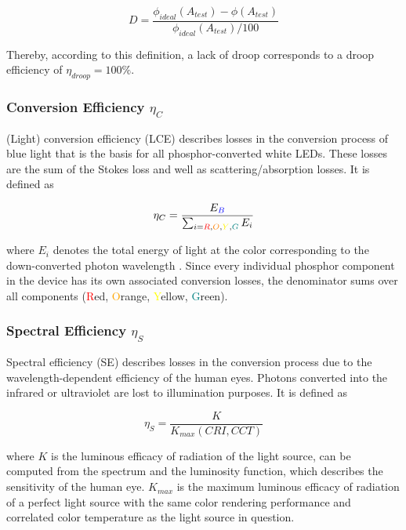 \documentclass[twoside,twocolumn,9pt]{article}
\begin{document}
\begin{equation}
\label{eqn:droop}
    D = \frac{\phi_{ideal}(A_{test})-\phi(A_{test})}{\phi_{ideal}(A_{test})/100}
\end{equation}

Thereby, according to this definition, a lack of droop corresponds to a droop efficiency of $\eta_{droop} = 100\%$\cite{schubert2018light}\cite{tsao2010solid}.

\subsubsection{Conversion Efficiency $\eta_{C}$}

(Light) conversion efficiency (LCE) describes losses in the conversion process of blue light that is the basis for all phosphor-converted white LEDs. These losses are the sum of the Stokes loss and well as scattering/absorption losses. It is defined as

\begin{equation}
    \eta_{C} = \frac{E_{\textcolor{blue}{B}}}{\sum_{i=\textcolor{red}{R},\textcolor{orange}{O},\textcolor{yellow}{Y},\textcolor{teal}{G}} E_i}
\end{equation}

where $E_i$ denotes the total energy of light at the color corresponding to the down-converted photon wavelength \cite{schubert2018light}\cite{tsao2010solid}. Since every individual phosphor component in the device has its own associated conversion losses, the denominator sums over all components (\textcolor{red}{R}ed, \textcolor{orange}{O}range, \textcolor{yellow}{Y}ellow, \textcolor{teal}{G}reen).

\subsubsection{Spectral Efficiency $\eta_{S}$}

Spectral efficiency (SE) describes losses in the conversion process due to the wavelength-dependent efficiency of the human eyes. Photons converted into the infrared or ultraviolet are lost to illumination purposes. It is defined as

\begin{equation}
    \eta_{S} = \frac{K}{K_{max}(CRI,CCT)}
\end{equation}

where $K$ is the luminous efficacy of radiation of the light source, can be computed from the spectrum and the luminosity function, which describes the sensitivity of the human eye. $K_{max}$ is the maximum luminous efficacy of radiation of a perfect light source with the same color rendering performance and correlated color temperature as the light source in question\cite{schubert2018light}\cite{tsao2010solid}.
\end{document}
